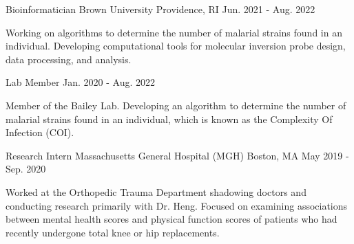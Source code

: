 
\begin{cventries}

\vspace{-1mm}
  \cventry
    {Bioinformatician} %
    {Brown University} %
    {Providence, RI} %
    {Jun. 2021 - Aug. 2022} %
    {
      \begin{cvitems} %
        \item {Working on algorithms to determine the number of malarial strains found in an individual. Developing computational tools for molecular inversion probe design, data processing, and analysis.}
      \end{cvitems}
    }

\vspace{-1mm}

\cventry
    {Lab Member} %
    {} %
    {} %
    {Jan. 2020 - Aug. 2022} %
    {
      \begin{cvitems} %
        \item {Member of the Bailey Lab. Developing an algorithm to determine the number of malarial strains found in an individual, which is known as the Complexity Of Infection (COI).}
      \end{cvitems}
    }

\vspace{-1mm}
  \cventry
    {Research Intern} %
    {Massachusetts General Hospital (MGH)} %
    {Boston, MA} %
    {May 2019 - Sep. 2020} %
    {
      \begin{cvitems} %
        \item {Worked at the Orthopedic Trauma Department shadowing doctors and conducting research primarily with Dr. Heng. Focused on examining associations between mental health scores and physical function scores of patients who had recently undergone total knee or hip replacements.}
      \end{cvitems}
    }


\end{cventries}
